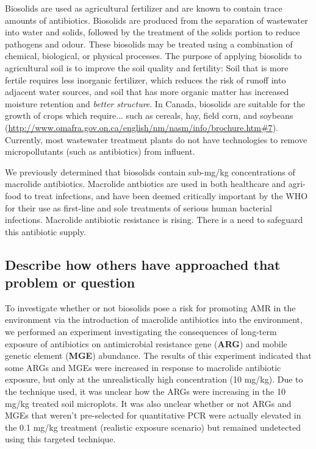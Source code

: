 Biosolids are used as agricultural fertilizer and are known to contain trace amounts of antibiotics.
Biosolids are produced from the separation of wastewater into water and solids, followed by the treatment of the solids portion to reduce pathogens and odour.
These biosolids may be treated using a combination of chemical, biological, or physical processes.
The purpose of applying biosolids to agricultural soil is to improve the soil quality and fertility:
Soil that is more fertile requires less inorganic fertilizer, which reduces the risk of runoff into adjacent water sources, and soil that has more organic matter has increased moisture retention and \textit{better structure}.
In Canada, biosolids are suitable for the growth of crops which require... such as cereals, hay, field corn, and soybeans (\url{http://www.omafra.gov.on.ca/english/nm/nasm/info/brochure.htm#7}).
Currently, most wastewater treatment plants do not have technologies to remove micropollutants (such as antibiotics) from influent.

We previously determined that biosolids contain sub-mg/kg concentrations of macrolide antibiotics.
Macrolide antbiotics are used in both healthcare and agri-food to treat infections, and have been deemed critically important by the WHO for their use as first-line and sole treatments of serious human bacterial infections.
Macrolide antibiotic resistance is rising.
There is a need to safeguard this antibiotic supply.

\subsection{Describe how others have approached that problem or question}

To investigate whether or not biosolids pose a risk for promoting AMR in the environment via the introduction of macrolide antibiotics into the environment, we performed an experiment investigating the consequences of long-term exposure of antibiotics on antimicrobial resistance gene (\textbf{ARG}) and mobile genetic element (\textbf{MGE}) abundance.
The results of this experiment indicated that some ARGs and MGEs were increased in response to macrolide antibiotic exposure, but only at the unrealistically high concentration (10 mg/kg).
Due to the technique used, it was unclear how the ARGs were increasing in the 10 mg/kg treated soil microplots.
It was also unclear whether or not ARGs and MGEs that weren't pre-selected for quantitative PCR were actually elevated in the 0.1 mg/kg treatment (realistic exposure scenario) but remained undetected using this targeted technique.

